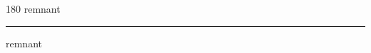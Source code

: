 
\begin{frame}
\begin{center}
\begin{turn}{180}
{\fontsize{2.5cm}{1em}\selectfont remnant}
\end{turn}
\vspace{1em}\par  
\hrule
\vspace{1em}\par  
{\fontsize{2.5cm}{1em}\selectfont remnant}
\end{center}
\end{frame}
